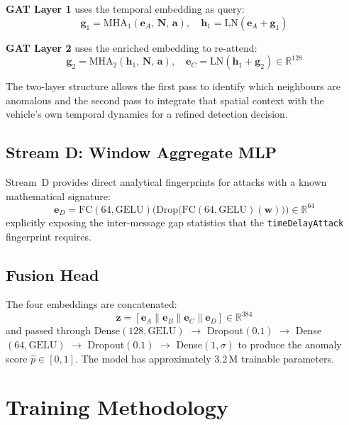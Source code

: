 \documentclass[conference]{IEEEtran}
\begin{document}
\textbf{GAT Layer 1} uses the temporal embedding as query:
\begin{equation}
\mathbf{g}_1 = \text{MHA}_1(\mathbf{e}_A,\, \mathbf{N},\, \mathbf{a}),
\quad
\mathbf{h}_1 = \text{LN}(\mathbf{e}_A + \mathbf{g}_1)
\end{equation}

\textbf{GAT Layer 2} uses the enriched embedding to re-attend:
\begin{equation}
\mathbf{g}_2 = \text{MHA}_2(\mathbf{h}_1,\, \mathbf{N},\, \mathbf{a}),
\quad
\mathbf{e}_C = \text{LN}(\mathbf{h}_1 + \mathbf{g}_2) \in \mathbb{R}^{128}
\end{equation}

The two-layer structure allows the first pass to identify which neighbours
are anomalous and the second pass to integrate that spatial context with
the vehicle's own temporal dynamics for a refined detection decision.

\subsection{Stream D: Window Aggregate MLP}
\label{sec:streamD}

Stream~D provides direct analytical fingerprints for attacks with a
known mathematical signature:
\begin{equation}
\mathbf{e}_D =
  \text{FC}(64,\text{GELU})\bigl(\text{Drop}\bigl(\text{FC}(64,\text{GELU})(\mathbf{w})\bigr)\bigr)
  \in \mathbb{R}^{64}
\end{equation}
explicitly exposing the inter-message gap statistics that the
\texttt{timeDelayAttack} fingerprint requires.

\subsection{Fusion Head}

The four embeddings are concatenated:
\begin{equation}
\mathbf{z} = [\mathbf{e}_A \| \mathbf{e}_B \| \mathbf{e}_C \| \mathbf{e}_D]
  \in \mathbb{R}^{384}
\end{equation}
and passed through Dense$(128,\text{GELU})$ $\to$ Dropout$(0.1)$ $\to$
Dense$(64,\text{GELU})$ $\to$ Dropout$(0.1)$ $\to$ Dense$(1,\sigma)$ to
produce the anomaly score $\hat{p} \in [0,1]$.  The model has
approximately 3.2\,M trainable parameters.

\section{Training Methodology}
\label{sec:method}
\end{document}
